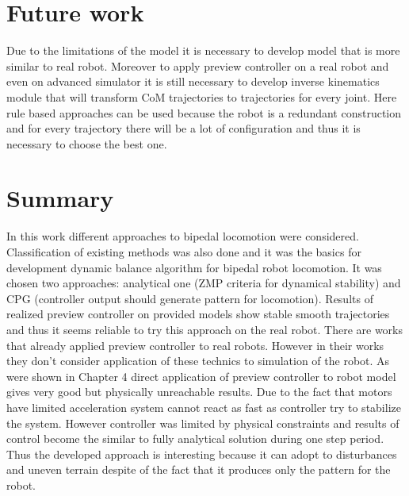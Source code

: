 \documentclass[12pt,a4paper]{report}
\begin{document}
	\chapter{Future work}
		Due to the limitations of the model it is necessary to develop model that is more similar to real robot. Moreover to apply preview controller on a real robot and even on advanced simulator it is still necessary to develop inverse kinematics module that will transform CoM trajectories to trajectories for every joint. Here rule based approaches can be used because the robot is a redundant construction and for every trajectory there will be a lot of configuration and thus it is necessary to choose the best one.
	\chapter{Summary}
		In this work different approaches to bipedal locomotion were considered. Classification of existing methods was also done and it was the basics for development dynamic balance algorithm for bipedal robot locomotion. It was chosen two approaches: analytical one (ZMP criteria for dynamical stability) and CPG (controller output should generate pattern for locomotion). Results of realized preview controller on provided models show stable smooth trajectories and thus it seems reliable to try this approach on the real robot. There are works \cite{kajita2003biped, audren2014model} that already applied preview controller to real robots. However in their works they don't consider application of these technics to simulation of the robot. As were shown in Chapter 4 direct application of preview controller to robot model gives very good but physically unreachable results. Due to the fact that motors have limited acceleration system cannot react as fast as controller try to stabilize the system. However controller was limited by physical constraints and results of control become the similar to fully analytical solution during one step period. Thus the developed approach is interesting because it can adopt to disturbances and uneven terrain despite of the fact that it produces only the pattern for the robot.
			
	
	
	
\end{document}
